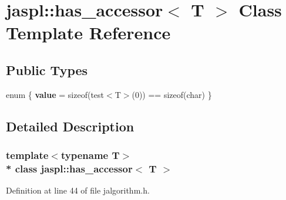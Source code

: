 \hypertarget{classjaspl_1_1has__accessor}{}\section{jaspl\+:\+:has\+\_\+accessor$<$ T $>$ Class Template Reference}
\label{classjaspl_1_1has__accessor}
\subsection*{Public Types}
\begin{DoxyCompactItemize}
\item 
enum \{ {\bfseries value} = sizeof(test$<$T$>$(0)) == sizeof(char)
 \}\hypertarget{classjaspl_1_1has__accessor_a28163371a4d385252bfaacbed6770491}{}\label{classjaspl_1_1has__accessor_a28163371a4d385252bfaacbed6770491}

\end{DoxyCompactItemize}


\subsection{Detailed Description}
\subsubsection*{template$<$typename T$>$\\*
class jaspl\+::has\+\_\+accessor$<$ T $>$}



Definition at line 44 of file jalgorithm.\+h.

